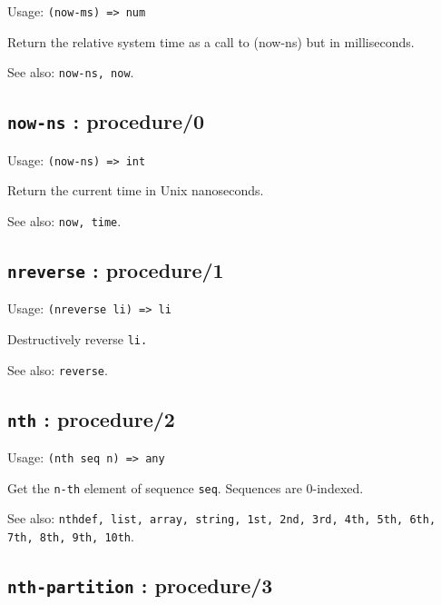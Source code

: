 \documentclass[
]{article}
\newcommand{\passthrough}[1]{#1}
\begin{document}
Usage: \passthrough{\lstinline!(now-ms) => num!}

Return the relative system time as a call to (now-ns) but in
milliseconds.

See also: \passthrough{\lstinline!now-ns, now!}.

\hypertarget{now-ns-procedure0-1}{%
\subsection{\texorpdfstring{\texttt{now-ns} :
procedure/0}{now-ns : procedure/0}}\label{now-ns-procedure0-1}}

Usage: \passthrough{\lstinline!(now-ns) => int!}

Return the current time in Unix nanoseconds.

See also: \passthrough{\lstinline!now, time!}.

\hypertarget{nreverse-procedure1-1}{%
\subsection{\texorpdfstring{\texttt{nreverse} :
procedure/1}{nreverse : procedure/1}}\label{nreverse-procedure1-1}}

Usage: \passthrough{\lstinline!(nreverse li) => li!}

Destructively reverse \passthrough{\lstinline!li.!}

See also: \passthrough{\lstinline!reverse!}.

\hypertarget{nth-procedure2-1}{%
\subsection{\texorpdfstring{\texttt{nth} :
procedure/2}{nth : procedure/2}}\label{nth-procedure2-1}}

Usage: \passthrough{\lstinline!(nth seq n) => any!}

Get the \passthrough{\lstinline!n-th!} element of sequence
\passthrough{\lstinline!seq!}. Sequences are 0-indexed.

See also:
\passthrough{\lstinline!nthdef, list, array, string, 1st, 2nd, 3rd, 4th, 5th, 6th, 7th, 8th, 9th, 10th!}.

\hypertarget{nth-partition-procedure3-1}{%
\subsection{\texorpdfstring{\texttt{nth-partition} :
procedure/3}{nth-partition : procedure/3}}\label{nth-partition-procedure3-1}}
\end{document}
